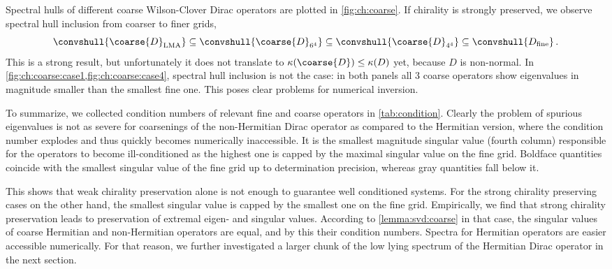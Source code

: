 Spectral hulls of different coarse Wilson-Clover Dirac operators are plotted in \cref{fig:ch:coarse}.
If chirality is strongly preserved, we observe spectral hull inclusion from coarser to finer grids,
\begin{equation}
\convshull{\coarse{D}_{\text{LMA}}} \subseteq
\convshull{\coarse{D}_{6^{4}}} \subseteq
\convshull{\coarse{D}_{4^{4}}} \subseteq
\convshull{D_{\text{fine}}} \,.
\end{equation}
This is a strong result, but unfortunately it does not translate to $\kappa(\coarse{D}) \leq \kappa(D)$ yet, because $D$ is non-normal.
In \cref{fig:ch:coarse:case1,fig:ch:coarse:case4}, spectral hull inclusion is not the case: in both panels all \num{3} coarse operators show eigenvalues in magnitude smaller than the smallest fine one.
This poses clear problems for numerical inversion.

To summarize, we collected condition numbers of relevant fine and coarse operators in \cref{tab:condition}.
Clearly the problem of spurious eigenvalues is not as severe for coarsenings of the non-Hermitian Dirac operator as compared to the Hermitian version, where the condition number explodes and thus quickly becomes numerically inaccessible.
It is the smallest magnitude singular value (fourth column) responsible for the operators to become ill-conditioned as the highest one is capped by the maximal singular value on the fine grid.
Boldface quantities coincide with the smallest singular value of the fine grid up to determination precision, whereas gray quantities fall below it.

This shows that weak chirality preservation alone is not enough to guarantee well conditioned systems.
For the strong chirality preserving cases on the other hand, the smallest singular value is capped by the smallest one on the fine grid.
Empirically, we find that strong chirality preservation leads to preservation of extremal eigen- and singular values.
According to \cref{lemma:svd:coarse} in that case, the singular values of coarse Hermitian and non-Hermitian operators are equal, and by this their condition numbers.
Spectra for Hermitian operators are easier accessible numerically.
For that reason, we further investigated a larger chunk of the low lying spectrum of the Hermitian Dirac operator in the next section.

